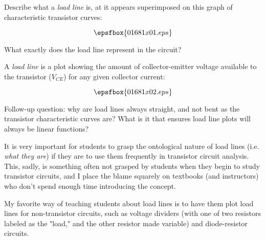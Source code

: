 

Describe what a {\it load line} is, at it appears superimposed on this graph of characteristic transistor curves:

$$\epsfbox{01681x01.eps}$$

What exactly does the load line represent in the circuit?







A {\it load line} is a plot showing the amount of collector-emitter voltage available to the transistor ($V_{CE}$) for any given collector current:

$$\epsfbox{01681x02.eps}$$

Follow-up question: why are load lines always straight, and not bent as the transistor characteristic curves are?  What is it that ensures load line plots will always be linear functions?







It is very important for students to grasp the ontological nature of load lines (i.e. {\it what they are}) if they are to use them frequently in transistor circuit analysis.  This, sadly, is something often not grasped by students when they begin to study transistor circuits, and I place the blame squarely on textbooks (and instructors) who don't spend enough time introducing the concept.

My favorite way of teaching students about load lines is to have them plot load lines for non-transistor circuits, such as voltage dividers (with one of two resistors labeled as the "load," and the other resistor made variable) and diode-resistor circuits.




